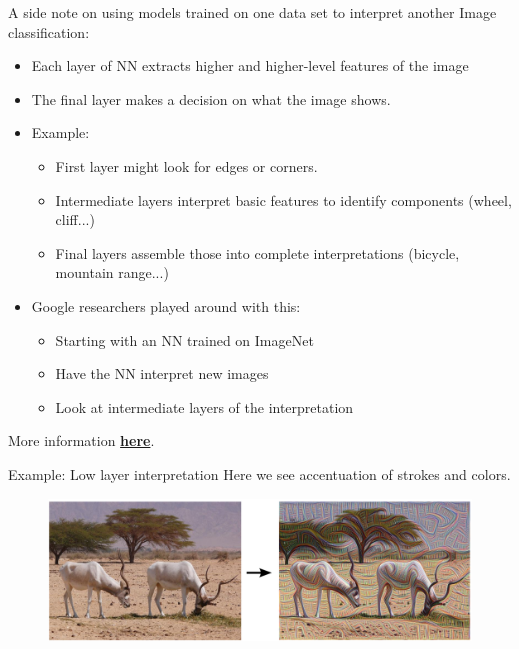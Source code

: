 \documentclass[mathserif, aspectratio=169]{beamer}
\begin{document}
\begin{frame}
\begin{columns}[c]
	\end{columns}
\end{frame}


\begin{frame}{A side note on using models trained on one data set to interpret another}
	Image classification:
	\begin{itemize}
		\item Each layer of NN extracts higher and higher-level features of the image
		\item The final layer makes a decision on what the image shows. 
		\item Example: 
		\begin{itemize}
			\item First layer might look for edges or corners. 
			\item Intermediate layers interpret basic features to identify components (wheel, cliff...)
			\item Final layers assemble those into complete interpretations (bicycle, mountain range...)
		\end{itemize}
		\item Google researchers played around with this:
		\begin{itemize}
			\item Starting with an NN trained on ImageNet
			\item Have the NN interpret new images
			\item Look at intermediate layers of the interpretation
		\end{itemize}
	\end{itemize}

	More information \href{https://ai.googleblog.com/2015/06/inceptionism-going-deeper-into-neural.html}{\textbf{here}}.

\end{frame}

\begin{frame}{Example: Low layer interpretation}
Here we see accentuation of strokes and colors.
\begin{figure}
\includegraphics[width=\textwidth]{ibis_google}
\caption*{}
\end{figure}
\end{frame}
\end{document}
